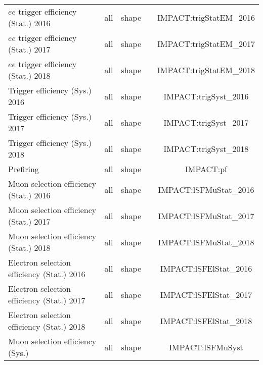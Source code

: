 \begin{table}
\begin{tabular}{l|c|c|c|c}
      $ee$ trigger efficiency (Stat.)     2016            & all                   & shape             &                     & IMPACT:trigStatEM_2016  \\
      $ee$ trigger efficiency (Stat.)     2017            & all                   & shape             &                     & IMPACT:trigStatEM_2017  \\
      $ee$ trigger efficiency (Stat.)     2018            & all                   & shape             &                     & IMPACT:trigStatEM_2018  \\
      Trigger efficiency (Sys.)           2016            & all                   & shape             &                     & IMPACT:trigSyst_2016  \\
      Trigger efficiency (Sys.)           2017            & all                   & shape             &                     & IMPACT:trigSyst_2017  \\
      Trigger efficiency (Sys.)           2018            & all                   & shape             &                     & IMPACT:trigSyst_2018  \\
      Prefiring                                           & all                   & shape             &                     & IMPACT:pf  \\
      Muon selection efficiency (Stat.)     2016          & all                   & shape             &                     & IMPACT:lSFMuStat_2016  \\
      Muon selection efficiency (Stat.)     2017          & all                   & shape             &                     & IMPACT:lSFMuStat_2017  \\
      Muon selection efficiency (Stat.)     2018          & all                   & shape             &                     & IMPACT:lSFMuStat_2018  \\
      Electron selection efficiency (Stat.) 2016          & all                   & shape             &                     & IMPACT:lSFElStat_2016  \\
      Electron selection efficiency (Stat.) 2017          & all                   & shape             &                     & IMPACT:lSFElStat_2017  \\
      Electron selection efficiency (Stat.) 2018          & all                   & shape             &                     & IMPACT:lSFElStat_2018  \\
      Muon selection efficiency (Sys.)                    & all                   & shape             &                     & IMPACT:lSFMuSyst  \\

\end{tabular}
\end{table}
